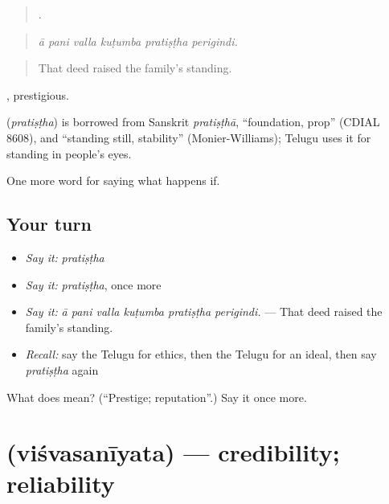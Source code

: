 \begin{quote}
     .
\end{quote}

\begin{quote}
\emph{ā pani valla kuṭumba pratiṣṭha perigindi.}
\end{quote}

\begin{quote}
That deed raised the family’s standing.
\end{quote}

, prestigious.

\begin{cousinweb}
\textbf{} (\emph{pratiṣṭha}) is borrowed from Sanskrit \emph{pratiṣṭhā}, \textquotedblleft{}foundation, prop\textquotedblright{} (CDIAL 8608), and \textquotedblleft{}standing still, stability\textquotedblright{} (Monier-Williams); Telugu uses it for standing in people’s eyes.
\end{cousinweb}

\begin{grammarlens}[title={What you've built}]
One more word for saying what happens if.
\end{grammarlens}

\subsection*{Your turn}
\begin{itemize}
\raggedright
  \item \emph{Say it:} \emph{pratiṣṭha}
  \item \emph{Say it:} \emph{pratiṣṭha}, once more
  \item \emph{Say it:} \emph{ā pani valla kuṭumba pratiṣṭha perigindi.} — That deed raised the family’s standing.
  \item \emph{Recall:} say the Telugu for ethics, then the Telugu for an ideal, then say \emph{pratiṣṭha} again
\end{itemize}

\begin{tcolorbox}[breakable,colback=teal!4,colframe=teal!35!black,title={Before you move on}]
What does  mean? (\textquotedblleft{}Prestige; reputation\textquotedblright{}.) Say it once more.
\end{tcolorbox}
\section[\texorpdfstring{\te{విశ్వసనీయత} (viśvasanīyata)}{విశ్వసనీయత (viśvasanīyata)}]{ (viśvasanīyata) — credibility; reliability}

